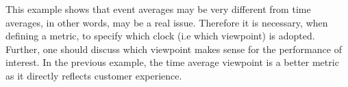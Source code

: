 %
%
%
%
%
%
%
%

This example shows that event averages may be very different from
time averages, in other words,  may be a real
issue. Therefore it is necessary, when defining a metric, to specify
which clock (i.e which viewpoint) is adopted. Further, one should
discuss which viewpoint makes sense for the performance of interest.
In the previous example, the time average viewpoint is a better
metric as it directly reflects customer experience.


